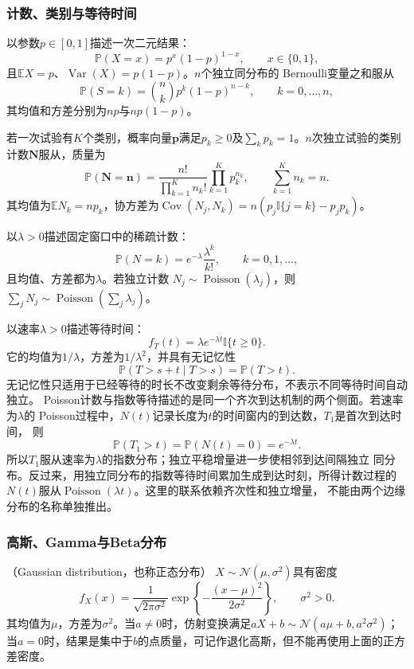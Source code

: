 \subsubsection{计数、类别与等待时间}

以参数\(p\in[0,1]\)描述一次二元结果：
\[ \mathbb{P}(X=x)=p^x(1-p)^{1-x},
  \qquad x\in\{0,1\}, \]
且\(\mathbb{E}X=p\)、\(\operatorname{Var}(X)=p(1-p)\)。\(n\)个独立同分布的
Bernoulli变量之和服从
\[ \mathbb{P}(S=k)
  =\binom{n}{k}p^k(1-p)^{n-k},\qquad k=0,\ldots,n, \]
其均值和方差分别为\(np\)与\(np(1-p)\)。

若一次试验有\(K\)个类别，概率向量\(\bm{p}\)满足\(p_k\geq0\)及\(\sum_kp_k=1\)。\(n\)次独立试验的类别计数\(\bm{N}\)服从，质量为
\[ \mathbb{P}(\bm{N}=\bm{n})
  =\frac{n!}{\prod_{k=1}^{K}n_k!}\prod_{k=1}^{K}p_k^{n_k},\qquad\sum_{k=1}^{K}n_k=n. \]
其均值为\(\mathbb{E}N_k=np_k\)，协方差为\(\operatorname{Cov}(N_j,N_k)=n(p_j\mathbb{I}\{j=k\}-p_jp_k)\)。

以\(\lambda>0\)描述固定窗口中的稀疏计数：
\[ \mathbb{P}(N=k)
  =e^{-\lambda}\frac{\lambda^k}{k!},\qquad k=0,1,\ldots, \]
且均值、方差都为\(\lambda\)。若独立计数
\(N_j\sim\operatorname{Poisson}(\lambda_j)\)，则\(\sum_jN_j\sim\operatorname{Poisson}(\sum_j\lambda_j)\)。

以速率\(\lambda>0\)描述等待时间：
\[ f_T(t)=\lambda e^{-\lambda t}\mathbb{I}\{t\geq0\}. \]
它的均值为\(1/\lambda\)，方差为\(1/\lambda^2\)，并具有无记忆性
\[ \mathbb{P}(T>s+t\mid T>s)=\mathbb{P}(T>t). \]
无记忆性只适用于已经等待的时长不改变剩余等待分布，不表示不同等待时间自动独立。
Poisson计数与指数等待描述的是同一个齐次到达机制的两个侧面。若速率为\(\lambda\)的
Poisson过程中，\(N(t)\)记录长度为\(t\)的时间窗内的到达数，\(T_1\)是首次到达时间，
则
\[
  \mathbb{P}(T_1>t)
  =
  \mathbb{P}(N(t)=0)
  =
  e^{-\lambda t}.
\]
所以\(T_1\)服从速率为\(\lambda\)的指数分布；独立平稳增量进一步使相邻到达间隔独立
同分布。反过来，用独立同分布的指数等待时间累加生成到达时刻，所得计数过程的
\(N(t)\)服从\(\operatorname{Poisson}(\lambda t)\)。这里的联系依赖齐次性和独立增量，
不能由两个边缘分布的名称单独推出。

\subsubsection{高斯、Gamma与Beta分布}

（Gaussian distribution，也称正态分布）
\(X\sim\mathcal{N}(\mu,\sigma^2)\)具有密度
\[ f_X(x)
  =\frac{1}{\sqrt{2\pi\sigma^2}}\exp\left\{-\frac{(x-\mu)^2}{2\sigma^2}\right\},\qquad \sigma^2>0. \]
其均值为\(\mu\)，方差为\(\sigma^2\)。当\(a\neq0\)时，仿射变换满足\(aX+b\sim\mathcal{N}(a\mu+b,a^2\sigma^2)\)；当\(a=0\)时，结果是集中于\(b\)的点质量，可记作退化高斯，但不能再使用上面的正方差密度。


